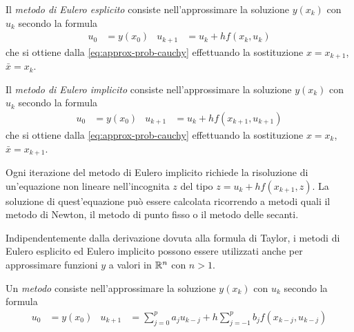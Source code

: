 	\begin{definizione}\label{def:metodo-eulero-espl}
		Il \emph{metodo di Eulero esplicito} consiste nell'approssimare la soluzione \(y (x_k)\) con \(u_k\) secondo la formula
		\begin{align}\label{eq:metodo-eulero-espl}
			u_0 &= y (x_0) &
			u_{k + 1} &= u_k + h f (x_k, u_k)
		\end{align}
		che si ottiene dalla \eqref{eq:approx-prob-cauchy} effettuando la sostituzione \(x = x_{k + 1}\), \(\bar{x} = x_k\).
	\end{definizione}
	
	\begin{definizione}\label{def:metodo-eulero-impl}
		Il \emph{metodo di Eulero implicito} consiste nell'approssimare la soluzione \(y (x_k)\) con \(u_k\) secondo la formula
		\begin{align}\label{eq:metodo-eulero-impl}
			u_0 &= y (x_0) &
			u_{k + 1} &= u_k + h f (x_{k + 1}, u_{k + 1})
		\end{align}
		che si ottiene dalla \eqref{eq:approx-prob-cauchy} effettuando la sostituzione \(x = x_k\), \(\bar{x} = x_{k + 1}\).
	\end{definizione}
	
	\begin{osservazione}
		Ogni iterazione del metodo di Eulero implicito richiede la risoluzione di un'equazione non lineare nell'incognita \(z\) del tipo \(z = u_k + h f(x_{k + 1}, z)\). La soluzione di quest'equazione può essere calcolata ricorrendo a metodi quali il metodo di Newton, il metodo di punto fisso o il metodo delle secanti.
	\end{osservazione}

	\begin{osservazione}
		Indipendentemente dalla derivazione dovuta alla formula di Taylor, i metodi di Eulero esplicito ed Eulero implicito possono essere utilizzati anche per approssimare funzioni \(y\) a valori in \(\mathbb{R}^n\) con \(n > 1\).
	\end{osservazione}

	\begin{definizione}\label{def:metodo-lm}
		Un \emph{metodo } consiste nell'approssimare la soluzione \(y (x_k)\) con \(u_k\) secondo la formula
		\begin{align}\label{eq:metodo-lm}
			u_0 &= y (x_0) &
			u_{k + 1} &= \sum_{j = 0}^p a_j u_{k - j} + h \sum_{j = - 1}^p b_j f (x_{k - j}, u_{k - j})
		\end{align}
	\end{definizione}


